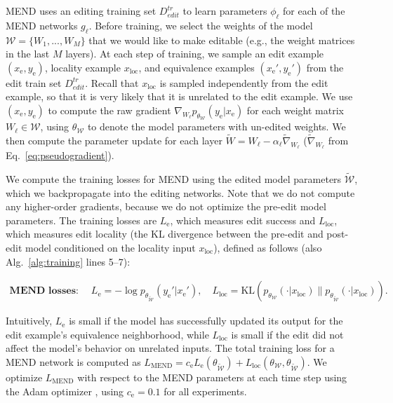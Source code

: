 \documentclass{article}
\newcommand{\name}{MEND}
\newcommand{\baseparams}{\theta}
\newcommand{\xe}{x_\text{e}}
\newcommand{\xloc}{x_\text{loc}}
\newcommand{\ye}{y_\text{e}}
\newcommand{\losse}{L_\text{e}}
\newcommand{\lossl}{L_\text{loc}}
\newcommand{\losstotal}{L_\text{MEND}}
\newcommand{\dtrain}{D^{tr}_{edit}}
\begin{document}
{\name} uses an editing training set $\dtrain$ to learn parameters $\phi_\ell$ for each of the {\name} networks $g_\ell$. Before training, we select the weights of the model $\mathcal{W}=\{W_1,...,W_M\}$ that we would like to make editable (e.g., the weight matrices in the last $M$ layers). At each step of training, we sample an edit example $(\xe,\ye)$, locality example $\xloc$, and equivalence examples $(\xe',\ye')$ from the edit train set $\dtrain$. Recall that $\xloc$ is sampled independently from the edit example, so that it is very likely that it is unrelated to the edit example. We use $(\xe,\ye)$ to compute the raw gradient $\nabla_{W_\ell}p_{\baseparams_\mathcal{W}}(\ye|\xe)$ for each weight matrix $W_\ell\in\mathcal{W}$, using $\baseparams_\mathcal{W}$ to denote the model parameters with un-edited weights. We then compute the parameter update for each layer $\tilde W = W_\ell - \alpha_\ell\tilde{\nabla}_{W_\ell}$ ($\tilde{\nabla}_{W_\ell}$ from Eq.~\ref{eq:pseudogradient}).

We compute the training losses for {\name} using the edited model parameters $\mathcal{\tilde W}$, which we backpropagate into the editing networks. Note that we do not compute any higher-order gradients, because we do not optimize the pre-edit model parameters. The training losses are $\losse$, which measures edit success and $\lossl$, which measures edit locality (the KL divergence between the pre-edit and post-edit model conditioned on the locality input $\xloc$), defined as follows (also Alg.~\ref{alg:training} lines 5--7):
\vspace{-4mm}
\begin{tcolorbox}[top=-10pt,bottom=-2pt]
\begin{subequations}
    \label{eq:losses}
    \begin{gather}
        \textbf{{\name} losses:}\quad\; \losse = -\log p_{\baseparams_\mathcal{\tilde W}}(\ye'|\xe'),\quad\lossl = \text{KL}(p_{\baseparams_\mathcal{W}}(\cdot|\xloc) \| p_{\baseparams_\mathcal{\tilde W}}(\cdot|\xloc)). \tag{\theequation a,b}
    \end{gather}
\end{subequations}
\end{tcolorbox}
\vspace{-1mm}
Intuitively, $\losse$ is small if the model has successfully updated its output for the edit example's equivalence neighborhood, while $\lossl$ is small if the edit did not affect the model's behavior on unrelated inputs.  The total training loss for a {\name} network is computed as $\losstotal = c_\text{e} \losse(\baseparams_\mathcal{\tilde W}) + \lossl(\baseparams_\mathcal{W},\baseparams_\mathcal{\tilde W})$. We optimize $\losstotal$ with respect to the {\name} parameters at each time step using the Adam optimizer \citep{kingma2015adam}, using $c_\text{e}=0.1$ for all experiments.
\end{document}
